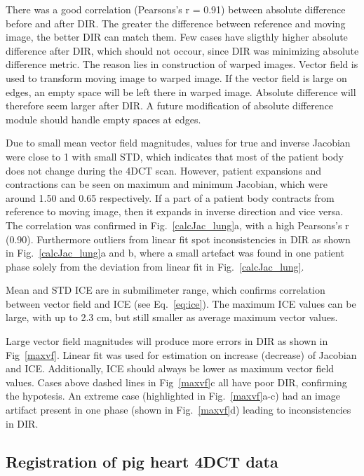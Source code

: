 \documentclass[type=dr, dr=rernat, accentcolor=tud7b,colorbacktitle, bigchapter, openright, twoside, 12pt ]{tudthesis}
\begin{document}
There was a good correlation (Pearsons's r = 0.91) between absolute difference before and after DIR. The greater the difference between reference and moving image, the better DIR can match them. Few cases
have sligthly higher absolute difference after DIR, which should not occour, since DIR was minimizing absolute difference metric. The reason lies in construction of warped images. Vector field is used to transform
moving image to warped image. If the vector field is large on edges, an empty space will be left there in warped image. Absolute difference will therefore seem larger after DIR. A future modification of absolute difference
module should handle empty spaces at edges.

Due to small mean vector field magnitudes, values for true and inverse Jacobian were close to 1 with small STD, which indicates that most of the patient body does not change during the 4DCT scan.
However, patient expansions and contractions can be seen on maximum and minimum Jacobian, which were around 1.50 and 0.65 respectively. If a part of a patient body contracts from reference to moving image, 
then it expands in inverse direction and vice versa. The correlation was confirmed in Fig.~\ref{calcJac_lung}a, with a high Pearsons's r (0.90). Furthermore outliers from linear fit spot inconsistencies
in DIR as shown in Fig.~\ref{calcJac_lung}a and b, where a small artefact was found in one patient phase solely from the deviation from linear fit in Fig.~\ref{calcJac_lung}.

Mean and STD ICE are in submilimeter range, which confirms correlation between vector field and ICE (see Eq.~\ref{eq:ice}). The maximum ICE values can be large, with up to 2.3 cm, 
but still smaller as average maximum vector values. 

Large vector field magnitudes will produce more errors in DIR as shown in Fig~\ref{maxvf}. Linear fit was used for estimation on increase (decrease) of Jacobian and ICE. Additionally, ICE
should always be lower as maximum vector field values. Cases above dashed lines in Fig~\ref{maxvf}c all have poor DIR, confirming the hypotesis. An extreme case (highlighted in Fig.~\ref{maxvf}a-c)
had an image artifact present in one phase (shown in Fig.~\ref{maxvf}d) leading to inconsistencies in DIR.


\newpage
\subsection{Registration of pig heart 4DCT data}
\end{document}
